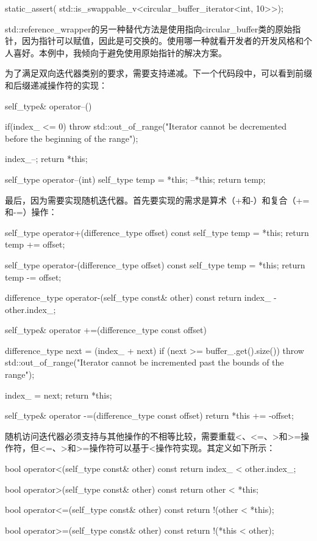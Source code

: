 \begin{cppcode}
static_assert(
	std::is_swappable_v<circular_buffer_iterator<int, 10>>);
\end{cppcode}

\begin{important}
std::reference_wrapper的另一种替代方法是使用指向circular_buffer类的原始指针，因为指针可以赋值，因此是可交换的。使用哪一种就看开发者的开发风格和个人喜好。本例中，我倾向于避免使用原始指针的解决方案。
\end{important}

为了满足双向迭代器类别的要求，需要支持递减。下一个代码段中，可以看到前缀和后缀递减操作符的实现：

\begin{cppcode}
self_type& operator--()
{
	if(index_ <= 0)
		throw std::out_of_range("Iterator cannot be
			decremented before the beginning of the range");
			
	index_--;
	return *this;
}

self_type operator--(int)
{
	self_type temp = *this;
	--*this;
	return temp;
}
\end{cppcode}

最后，因为需要实现随机迭代器。首先要实现的需求是算术（+和-）和复合（+=和-=）操作：

\begin{cppcode}
self_type operator+(difference_type offset) const
{
	self_type temp = *this;
	return temp += offset;
}

self_type operator-(difference_type offset) const
{
	self_type temp = *this;
	return temp -= offset;
}

difference_type operator-(self_type const& other) const
{
	return index_ - other.index_;
}

self_type& operator +=(difference_type const offset)
{
	difference_type next =
		(index_ + next) %
	if (next >= buffer_.get().size())
		throw std::out_of_range("Iterator cannot be
								 incremented past the bounds of the range");
								 
	index_ = next;
	return *this;
}

self_type& operator -=(difference_type const offset)
{
	return *this += -offset;
}
\end{cppcode}

随机访问迭代器必须支持与其他操作的不相等比较，需要重载<、<=、>和>=操作符，但<=、>和>=操作符可以基于<操作符实现。其定义如下所示：

\begin{cppcode}
bool operator<(self_type const& other) const
{
	return index_ < other.index_;
}

bool operator>(self_type const& other) const
{
	return other < *this;
}

bool operator<=(self_type const& other) const
{
	return !(other < *this);
}

bool operator>=(self_type const& other) const
{
	return !(*this < other);
}
\end{cppcode}

